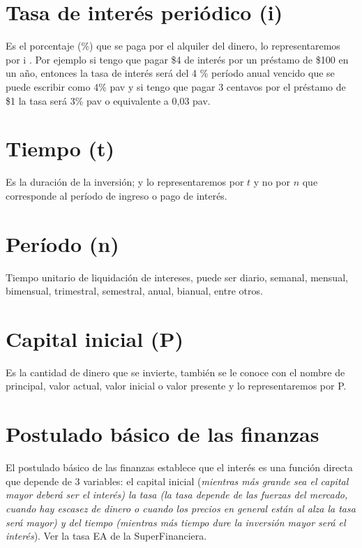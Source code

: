 \section{Tasa de interés periódico (i)}
Es el porcentaje (\%) que se paga por el alquiler del dinero, lo representaremos por i . Por ejemplo si tengo que pagar \$4 de interés por un préstamo de \$100 en un año, entonces la tasa de interés será del 4 \% período anual vencido que se puede escribir como 4\% pav y si tengo que pagar 3 centavos por el préstamo de \$1 la tasa será  3\% pav o equivalente a 0,03 pav.

\section{Tiempo (t)}
Es la duración de la inversión; y lo representaremos por $t$ y no por $n$ que corresponde al período de ingreso o pago de interés. %

\section{Período (n)}
Tiempo unitario de liquidación de intereses, puede ser diario, semanal, mensual, bimensual, trimestral, semestral, anual, bianual, entre otros. %

\section{Capital inicial (P)}
Es la cantidad de dinero que se invierte, también se le conoce con el nombre de principal, valor actual, valor inicial o valor presente y lo representaremos por P.

\section{Postulado básico de las finanzas}
El postulado básico de las finanzas establece que el interés es una función directa que depende de 3 variables: el capital inicial (\textit{mientras más grande sea el capital mayor deberá ser el interés) la tasa (la tasa depende de las fuerzas del mercado, cuando hay escasez de dinero o cuando los precios en general están al alza la tasa será mayor) y del tiempo (mientras más tiempo dure la inversión mayor será el interés}). Ver la tasa EA de la SuperFinanciera.

